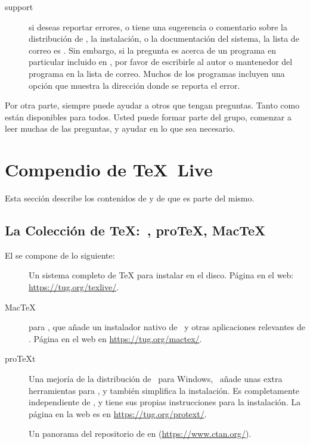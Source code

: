 \documentclass{article}
\begin{document}
\begin{description}
\item [\TL{} support] si deseas reportar errores, o tiene una sugerencia
	o comentario sobre la distribución de \TL{}, la instalación, o
	la documentación del sistema, la lista de correo es
	. Sin embargo, si la pregunta es
	acerca de un programa en particular incluido en \TL{}, por
	favor de escribirle al autor o mantenedor del programa en la
	lista de correo. Muchos de los programas incluyen una opción
	 que muestra la dirección donde se reporta el
	error. 

\end{description}

Por otra parte, siempre puede ayudar a otros que tengan preguntas.
Tanto  como  están disponibles
para todos. Usted puede formar parte del grupo, comenzar a leer muchas
de las preguntas, y ayudar en lo que sea necesario. 


\section{Compendio de \protect\TeX\protect\ Live}
\label{sec:overview-tl}

Esta sección describe los contenidos de \TL{} y de \TK{} que es parte
del mismo.

\subsection{La Colección de \protect\TeX\protect:~\TL{}, pro\TeX{}, Mac\TeX}
\label{sec:tl-coll-dists}

El \TK{} \DVD{} se compone de lo siguiente:

\begin{description}

\item [\TL] Un sistema completo de \TeX{} para instalar en el disco.
	Página en el web: \url{https://tug.org/texlive/}.

\item [Mac\TeX] para \macOS, que añade un instalador nativo de
	\macOS\ y otras aplicaciones relevantes de \TL{}. Página en
	el web en \url{https://tug.org/mactex/}.

\item [pro\TeX{}t] Una mejoría de la distribución de \MIKTEX\ para
	Windows, \ProTeXt\ añade unas extra herramientas para \MIKTEX,
	y también simplifica la instalación. Es completamente
	independiente de \TL{}, y tiene sus propias instrucciones para
	la instalación. La página en la web es en
	\url{https://tug.org/protext/}.

\item [\CTAN{}] Un panorama del repositorio de \CTAN{} en
	(\url{https://www.ctan.org/}).

\end{description}
\end{document}
